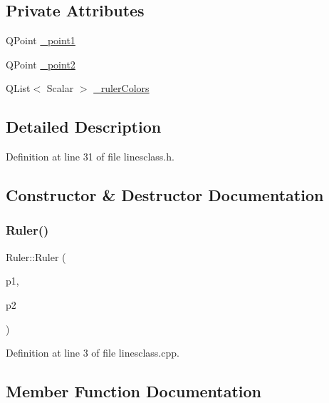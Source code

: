 \subsection*{Private Attributes}
\begin{DoxyCompactItemize}
\item 
Q\+Point \mbox{\hyperlink{classRuler_ae0b82ebbe2c601703de75c6aed392ed3}{\+\_\+point1}}
\item 
Q\+Point \mbox{\hyperlink{classRuler_aa33c51b7768f1852bea7389502079048}{\+\_\+point2}}
\item 
Q\+List$<$ Scalar $>$ \mbox{\hyperlink{classRuler_afa7fe69c326cc41b1ae71a8c69e41559}{\+\_\+ruler\+Colors}}
\end{DoxyCompactItemize}


\subsection{Detailed Description}


Definition at line 31 of file linesclass.\+h.



\subsection{Constructor \& Destructor Documentation}
\mbox{\label{classRuler_a9e0723f35460c16a91ee88278982e3e9}} 
\subsubsection{\texorpdfstring{Ruler()}{Ruler()}}
{\footnotesize\ttfamily Ruler\+::\+Ruler (\begin{DoxyParamCaption}\item[{Q\+Point}]{p1,  }\item[{Q\+Point}]{p2 }\end{DoxyParamCaption})}



Definition at line 3 of file linesclass.\+cpp.



\subsection{Member Function Documentation}
\mbox{\label{classRuler_aa86402b06c3d92112d49ca41e65b1897}} 
